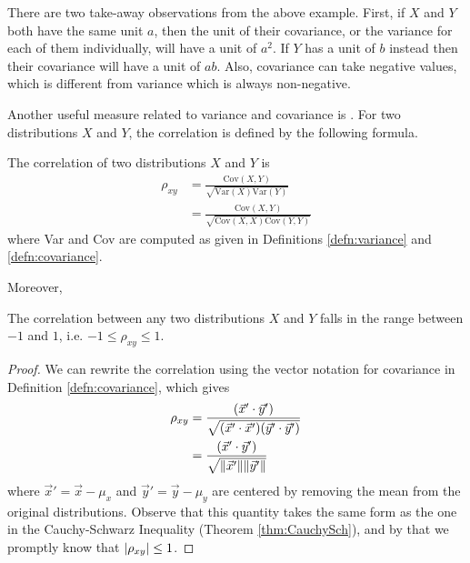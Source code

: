There are two take-away observations from the above example. First, if $X$ and $Y$ both have the same unit $a$, then the unit of their covariance, or the variance for each of them individually, will have a unit of $a^2$. If $Y$ has a unit of $b$ instead then their covariance will have a unit of $ab$. Also, covariance can take negative values, which is different from variance which is always non-negative.\par
Another useful measure related to variance and covariance is . For two distributions $X$ and $Y$, the correlation is defined by the following formula.
\begin{defn}[Correlation]
\label{defn:correlation}
The correlation of two distributions $X$ and $Y$ is
\begin{align*}
\rho_{xy} &= \frac{\text{Cov}(X,Y)}{\sqrt{\text{Var}(X) \text{Var}(Y)}} \\
&= \frac{\text{Cov}(X,Y)}{\sqrt{\text{Cov}(X,X) \text{Cov}(Y,Y)}}
\end{align*}
where Var and Cov are computed as given in Definitions \ref{defn:variance} and \ref{defn:covariance}.
\end{defn}
Moreover,
\begin{proper}
The correlation between any two distributions $X$ and $Y$ falls in the range between $-1$ and $1$, i.e. $-1 \leq \rho_{xy} \leq 1$.
\end{proper}
\begin{proof}
We can rewrite the correlation using the vector notation for covariance in Definition \ref{defn:covariance}, which gives
\begin{align*}
\rho_{xy} &= \frac{(\vec{x}' \cdot \vec{y}')}{\sqrt{(\vec{x}'\cdot\vec{x}')(\vec{y}'\cdot\vec{y}')}} \\
&= \frac{(\vec{x}' \cdot \vec{y}')}{\sqrt{{\norm{\vec{x}'}}\norm{\vec{y}'}}}
\end{align*}
where $\vec{x}' = \vec{x} - \mu_x$ and $\vec{y}' = \vec{y} - \mu_y$ are centered by removing the mean from the original distributions. Observe that this quantity takes the same form as the one in the Cauchy-Schwarz Inequality (Theorem \ref{thm:CauchySch}), and by that we promptly know that $\abs{\rho_{xy}} \leq 1$.    
\end{proof}

